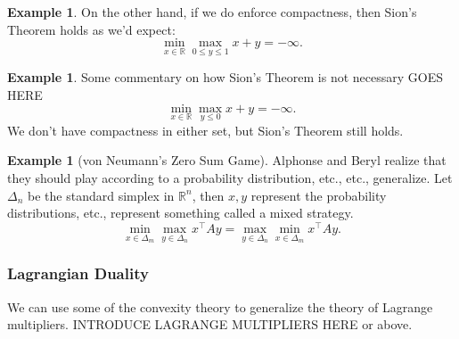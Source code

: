 \documentclass[11pt]{article}
\numberwithin{equation}{section}
\theoremstyle{definition}
\newtheorem{example}[theorem]{Example}
\newcommand{\bR}{\mathbb{R}}
\begin{document}
\begin{example}
    On the other hand, if we do enforce compactness, then Sion's Theorem holds as we'd expect:
    \begin{equation}
        \min_{x\in\bR}\max_{0\le y\le 1} x+y=-\infty.
    \end{equation}
\end{example}
\begin{example}
    Some commentary on how Sion's Theorem is not necessary GOES HERE
    \begin{equation}
        \min_{x\in\bR}\max_{y\le 0} x+y=-\infty.
    \end{equation}
    We don't have compactness in either set, but Sion's Theorem still holds.
\end{example}
\begin{example}[von Neumann's Zero Sum Game]
    Alphonse and Beryl realize that they should play according to a probability distribution, etc., etc., generalize. Let $\Delta_n$ be the standard simplex in $\bR^n$, then $x, y$ represent the probability distributions, etc., represent something called a mixed strategy.
    \begin{equation}
         \min_{x\in\Delta_m}\max_{y\in\Delta_n} x^\top Ay=\max_{y\in\Delta_n}\min_{x\in\Delta_m} x^\top Ay.
    \end{equation}
\end{example}
\subsubsection{Lagrangian Duality}
We can use some of the convexity theory to generalize the theory of Lagrange multipliers. INTRODUCE LAGRANGE MULTIPLIERS HERE or above.
\end{document}

